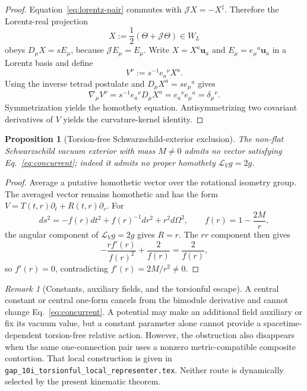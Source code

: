 \documentclass[12pt,a4paper]{article}
\newtheorem{proposition}[definition]{Proposition}
\theoremstyle{remark}\newtheorem{remark}[definition]{Remark}
\begin{document}
\begin{proof}
Equation~\eqref{eq:lorentz-pair} commutes with
$\mathcal JX=-X^\ddagger$.  Therefore the Lorentz-real projection
\begin{equation}
 X:=\frac12(\Theta+\mathcal J\Theta)\in W_L
\end{equation}
obeys $D_\mu X=sE_\mu$, because $\mathcal JE_\mu=E_\mu$.  Write
$X=X^a\mathbf u_a$ and $E_\mu=e_\mu{}^a\mathbf u_a$ in a Lorentz basis and
define
\begin{equation}
 V^\nu:=s^{-1}e_a{}^\nu X^a.
\end{equation}
Using the inverse tetrad postulate and $D_\mu X^a=s e_\mu{}^a$ gives
\begin{equation}
 \nabla_\mu V^\nu
 =s^{-1}e_a{}^\nu D_\mu X^a
 =e_a{}^\nu e_\mu{}^a
 =\delta_\mu{}^\nu.
\end{equation}
Symmetrization yields the homothety equation.  Antisymmetrizing two covariant
derivatives of $V$ yields the curvature-kernel identity.
\end{proof}

\begin{proposition}[Torsion-free Schwarzschild-exterior exclusion]
The non-flat Schwarzschild vacuum exterior with mass $M\ne0$ admits no vector
satisfying Eq.~\eqref{eq:concurrent}; indeed it admits no proper homothety
$\mathcal L_Vg=2g$.
\end{proposition}

\begin{proof}
Average a putative homothetic vector over the rotational isometry group.  The
averaged vector remains homothetic and has the form
$V=T(t,r)\partial_t+R(t,r)\partial_r$.  For
\begin{equation}
 ds^2=-f(r)dt^2+f(r)^{-1}dr^2+r^2d\Omega^2,
 \qquad f(r)=1-\frac{2M}{r},
\end{equation}
the angular component of $\mathcal L_Vg=2g$ gives $R=r$.  The $rr$ component
then gives
\begin{equation}
 -\frac{r f'(r)}{f(r)^2}+\frac{2}{f(r)}=\frac{2}{f(r)},
\end{equation}
so $f'(r)=0$, contradicting $f'(r)=2M/r^2\ne0$.
\end{proof}

\begin{remark}[Constants, auxiliary fields, and the torsionful escape]
A central constant or central one-form cancels from the bimodule derivative
and cannot change Eq.~\eqref{eq:concurrent}.  A potential may make an
additional field auxiliary or fix its vacuum value, but a constant parameter
alone cannot provide a spacetime-dependent torsion-free relative action.
However, the obstruction also disappears when the same one-connection pair
uses a nonzero metric-compatible composite contortion.  That local construction
is given in \texttt{gap\_10i\_torsionful\_local\_representer.tex}.  Neither
route is dynamically selected by the present kinematic theorem.
\end{remark}
\end{document}
